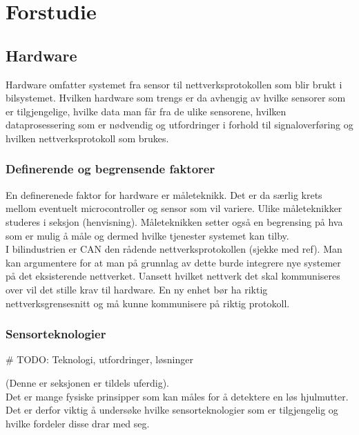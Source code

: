 \chapter{Forstudie}

\section{Hardware}

Hardware omfatter systemet fra sensor til nettverksprotokollen som blir brukt i
bilsystemet. Hvilken hardware
som trengs er da avhengig av hvilke sensorer som er tilgjengelige, hvilke data
man får fra de ulike sensorene, hvilken dataprosessering som er nødvendig og
utfordringer i forhold til signaloverføring og
hvilken nettverksprotokoll som brukes. \\

\subsection{Definerende og begrensende faktorer}

En definerenede faktor for hardware er måleteknikk. Det er da særlig krets
mellom eventuelt microcontroller og sensor som vil variere. Ulike måleteknikker studeres
i seksjon (henvisning). Måleteknikken setter også en begrensing på hva som er
mulig å måle og dermed hvilke tjenester systemet kan tilby. \\

I bilindustrien er CAN den rådende nettverksprotokollen (sjekke med ref). Man
kan argumentere for at man på grunnlag av dette burde integrere nye systemer på
det eksisterende nettverket. Uansett hvilket nettverk det skal kommuniseres over
vil det stille krav til hardware. En ny enhet bør ha riktig nettverksgrensesnitt
og må kunne kommunisere på riktig protokoll. \\

\subsection{Sensorteknologier}

# TODO: Teknologi, utfordringer, løsninger

(Denne er seksjonen er tildels uferdig). \\

Det er mange fysiske prinsipper som kan måles for å detektere en løs hjulmutter.
Det er derfor viktig å undersøke hvilke sensorteknologier som er tilgjengelig og
hvilke fordeler disse drar med seg. \\

